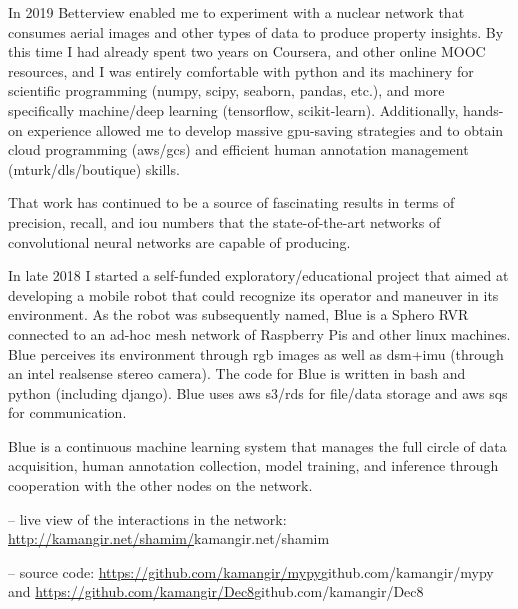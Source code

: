 \osspacing
In 2019 Betterview enabled me to experiment with a nuclear network that consumes aerial images and other types of data to produce property insights. By this time I had already spent two years on Coursera, and other online MOOC resources, and I was entirely comfortable with python and its machinery for scientific programming (numpy, scipy, seaborn, pandas, etc.), and more specifically machine/deep learning (tensorflow, scikit-learn). Additionally, hands-on experience allowed me to develop massive gpu-saving strategies and to obtain cloud programming (aws/gcs) and efficient human annotation management (mturk/dls/boutique) skills. 

\osspacing
That work has continued to be a source of fascinating results in terms of precision, recall, and iou numbers that the state-of-the-art networks of convolutional neural networks are capable of producing.

\osspacing
In late 2018 I started a self-funded exploratory/educational project that aimed at developing a mobile robot that could recognize its operator and maneuver in its environment. As the robot was subsequently named, Blue is a Sphero RVR connected to an ad-hoc mesh network of Raspberry Pis and other linux machines. Blue perceives its environment through rgb images as well as dsm+imu (through an intel realsense stereo camera). The code for Blue is written in bash and python (including django). Blue uses aws s3/rds for file/data storage and aws sqs for communication. 

\osspacing
Blue is a continuous machine learning system that manages the full circle of data acquisition, human annotation collection, model training, and inference through cooperation with the other nodes on the network. 

-- live view of the interactions in the network: \url{http://kamangir.net/shamim/}{kamangir.net/shamim} 

-- source code: \url{https://github.com/kamangir/mypy}{github.com/kamangir/mypy} and \url{https://github.com/kamangir/Dec8}{github.com/kamangir/Dec8}